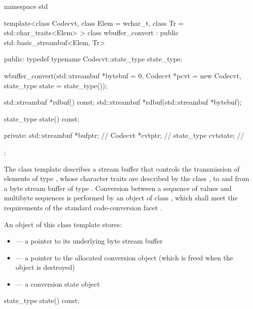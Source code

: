 \pnum
{}

%
\begin{codeblock}
namespace std {
template<class Codecvt,
    class Elem = wchar_t,
    class Tr = std::char_traits<Elem> >
  class wbuffer_convert
    : public std::basic_streambuf<Elem, Tr> {
  public:
    typedef typename Codecvt::state_type state_type;

    wbuffer_convert(std::streambuf *bytebuf = 0,
                    Codecvt *pcvt = new Codecvt,
                    state_type state = state_type());

    std::streambuf *rdbuf() const;
    std::streambuf *rdbuf(std::streambuf *bytebuf);

    state_type state() const;

  private:
    std::streambuf *bufptr;         // \expos
    Codecvt *cvtptr;                // \expos
    state_type cvtstate;            // \expos
    };
}
\end{codeblock}

\pnum
The class template describes a stream buffer that controls the
transmission of elements of type , whose character traits are
described by the class , to and from a byte stream buffer of type
. Conversion between a sequence of  values and
multibyte sequences is performed by an object of class
, which shall meet the requirements
of the standard code-conversion facet .

\pnum
An object of this class template stores:

\begin{itemize}
\item {} --- a pointer to its underlying byte stream buffer
\item {} --- a pointer to the allocated conversion object
(which is freed when the  object is destroyed)
\item {} --- a conversion state object
\end{itemize}

%
%
\begin{itemdecl}
state_type state() const;
\end{itemdecl}

